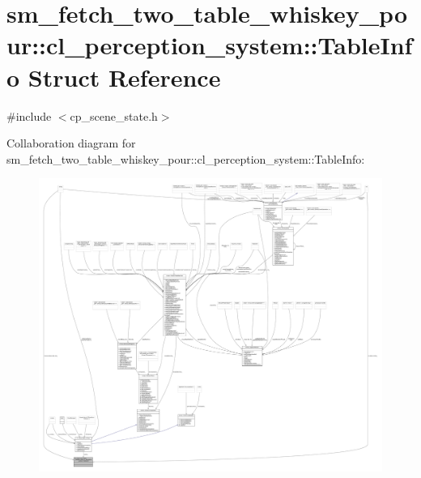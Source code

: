\hypertarget{structsm__fetch__two__table__whiskey__pour_1_1cl__perception__system_1_1TableInfo}{}\section{sm\+\_\+fetch\+\_\+two\+\_\+table\+\_\+whiskey\+\_\+pour\+:\+:cl\+\_\+perception\+\_\+system\+:\+:Table\+Info Struct Reference}
\label{structsm__fetch__two__table__whiskey__pour_1_1cl__perception__system_1_1TableInfo}


{\ttfamily \#include $<$cp\+\_\+scene\+\_\+state.\+h$>$}



Collaboration diagram for sm\+\_\+fetch\+\_\+two\+\_\+table\+\_\+whiskey\+\_\+pour\+:\+:cl\+\_\+perception\+\_\+system\+:\+:Table\+Info\+:
\nopagebreak
\begin{figure}[H]
\begin{center}
\leavevmode
\includegraphics[width=350pt]{structsm__fetch__two__table__whiskey__pour_1_1cl__perception__system_1_1TableInfo__coll__graph}
\end{center}
\end{figure}
